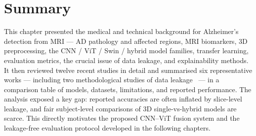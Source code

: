 \section{Summary}
This chapter presented the medical and technical background for Alzheimer's detection from MRI --- AD pathology and affected regions, MRI biomarkers, 3D preprocessing, the CNN / ViT / Swin / hybrid model families, transfer learning, evaluation metrics, the crucial issue of data leakage, and explainability methods. It then reviewed twelve recent studies in detail and summarised six representative works --- including two methodological studies of data leakage~\cite{wen2020convolutional,yagis2021effect} --- in a comparison table of models, datasets, limitations, and reported performance. The analysis exposed a key gap: reported accuracies are often inflated by slice-level leakage, and fair subject-level comparisons of 3D single-vs-hybrid models are scarce. This directly motivates the proposed CNN--ViT fusion system and the leakage-free evaluation protocol developed in the following chapters.

















